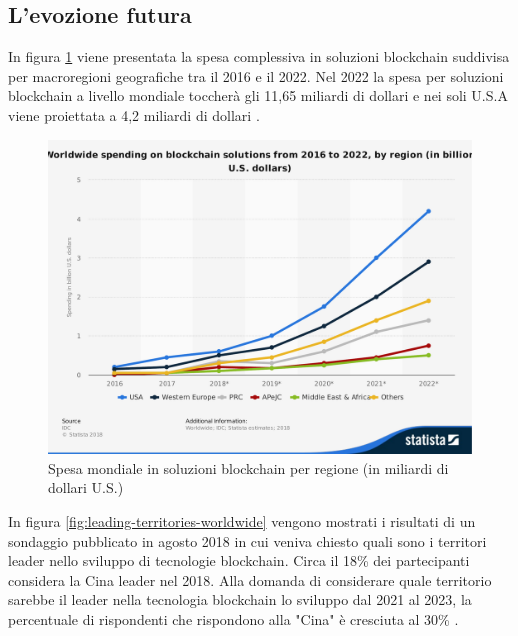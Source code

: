 \subsection{L'evozione futura}
In figura \ref{fig:global-blockchain-solutions-spending} viene presentata la spesa complessiva
in soluzioni blockchain suddivisa per macroregioni geografiche tra il 2016 e il 2022.
Nel 2022 la spesa per soluzioni blockchain a livello mondiale toccherà gli 11,65 miliardi di dollari
e nei soli U.S.A viene proiettata a 4,2 miliardi di dollari \cite{global-blockchain-solutions-spending}.
\begin{figure}[H]
	\centering
	\includegraphics[width=.75\linewidth]{images/chap_intro/global-blockchain-solutions-spending.pdf}
	\caption{Spesa mondiale in soluzioni blockchain per regione (in miliardi di
		dollari U.S.) \cite{global-blockchain-solutions-spending}}
	\label{fig:global-blockchain-solutions-spending}
\end{figure}

In figura \ref{fig:leading-territories-worldwide} vengono mostrati i risultati di un sondaggio
pubblicato in agosto 2018 in cui veniva chiesto
quali sono i territori leader nello sviluppo di tecnologie blockchain.
Circa il 18\% dei partecipanti considera la Cina leader nel 2018.
Alla domanda di considerare quale territorio sarebbe il leader nella tecnologia blockchain
lo sviluppo dal 2021 al 2023, la percentuale di rispondenti che
rispondono alla "Cina" è cresciuta al 30\% \cite{leading-territories-worldwide}.

